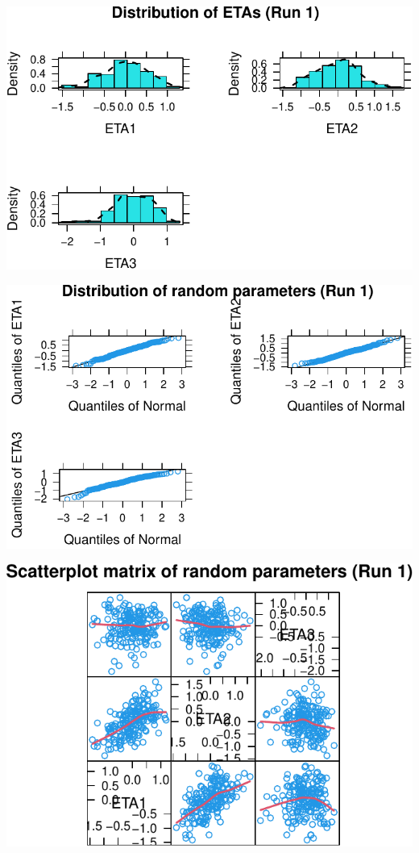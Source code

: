 \documentclass[
  letterpaper,
  toc=chapterentrywithdots,
  11pt,
  headings=small]{scrreprt}
\begin{document}
\includegraphics{sec/results_files/figure-pdf/unnamed-chunk-2-3.pdf}

\includegraphics{sec/results_files/figure-pdf/unnamed-chunk-2-4.pdf}

\includegraphics{sec/results_files/figure-pdf/unnamed-chunk-2-5.pdf}
\end{document}
